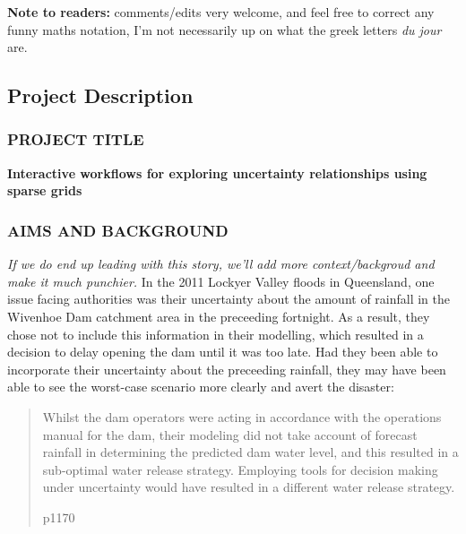 \documentclass[a4paper,fontsize=12pt]{scrartcl}
\author{}
\date{\today}
\begin{document}
\noindent
\textbf{Note to readers:} comments/edits very welcome, and feel free to correct any funny maths notation, I'm not
  necessarily up on what the greek letters \emph{du jour} are.

\renewcommand{\thesection}{\Alph{section}}

\setcounter{section}{3} %
\subsection{Project Description}
\label{sec:project-description}

\subsubsection*{PROJECT TITLE}

\textbf{Interactive workflows for exploring uncertainty relationships using sparse grids}

\subsubsection*{AIMS AND BACKGROUND}


\noindent\emph{If we do end
  up leading with this story, we'll add more context/backgroud and make it
  much punchier.} In the 2011 Lockyer Valley floods in Queensland,
one issue facing authorities was their uncertainty about the amount of
rainfall in the Wivenhoe Dam catchment area in the preceeding
fortnight. As a result, they chose not to include this information in
their modelling, which resulted in a decision to delay opening the dam
until it was too late. Had they been able to incorporate their
uncertainty about the preceeding rainfall, they may have been able to
see the worst-case scenario more clearly and avert the disaster:
\blockquote[\cite{vandenhonert_2011_2011} p1170]{Whilst the dam
  operators were acting in accordance with the operations manual for
  the dam, their modeling did not take account of forecast rainfall in
  determining the predicted dam water level, and this resulted in a
  sub-optimal water release strategy. Employing tools for decision
  making under uncertainty would have resulted in a different water
  release strategy.}
\end{document}
